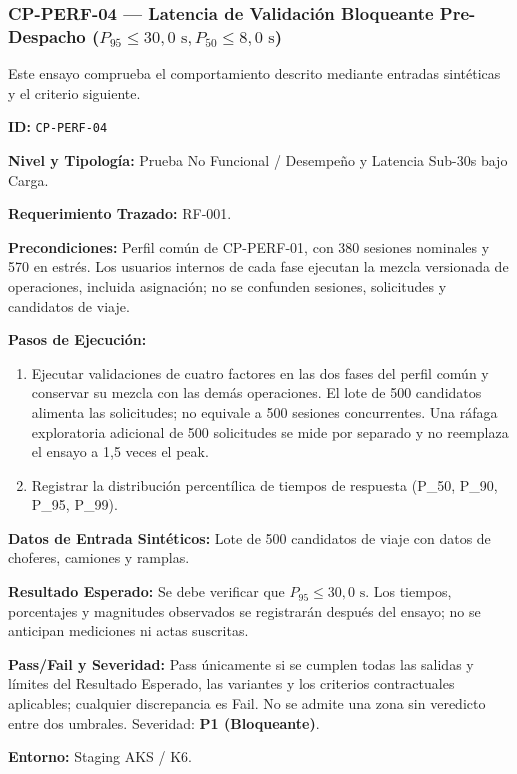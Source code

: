 \subsubsection*{CP-PERF-04 — Latencia de Validación Bloqueante Pre-Despacho ($P_{95} \le 30{,}0\text{ s}, P_{50} \le 8{,}0\text{ s}$)}\label{sec:9-cp-perf-04}
Este ensayo comprueba el comportamiento descrito mediante entradas sintéticas y el criterio siguiente.

\par\noindent \textbf{ID:} \texttt{CP-\allowbreak{}PERF-\allowbreak{}04}\par
\par\noindent \textbf{Nivel y Tipología:} Prueba No Funcional / Desempeño y Latencia Sub-30s bajo Carga.\par
\par\noindent \textbf{Requerimiento Trazado:} RF-001.\par
\par\noindent \textbf{Precondiciones:} Perfil común de CP-PERF-01, con 380 sesiones nominales y 570 en estrés. Los usuarios internos de cada fase ejecutan la mezcla versionada de operaciones, incluida asignación; no se confunden sesiones, solicitudes y candidatos de viaje.\par
\par\noindent \textbf{Pasos de Ejecución:}\par
\begin{enumerate}
\item Ejecutar validaciones de cuatro factores en las dos fases del perfil común y conservar su mezcla con las demás operaciones. El lote de 500 candidatos alimenta las solicitudes; no equivale a 500 sesiones concurrentes. Una ráfaga exploratoria adicional de 500 solicitudes se mide por separado y no reemplaza el ensayo a 1,5 veces el peak.
\item Registrar la distribución percentílica de tiempos de respuesta (P\_{50}, P\_{90}, P\_{95}, P\_{99}).
\end{enumerate}

\par\noindent \textbf{Datos de Entrada Sintéticos:} Lote de 500 candidatos de viaje con datos de choferes, camiones y ramplas.\par
\par\noindent \textbf{Resultado Esperado:} Se debe verificar que $P_{95} \le 30{,}0\text{ s}$. Los tiempos, porcentajes y magnitudes observados se registrarán después del ensayo; no se anticipan mediciones ni actas suscritas.\par
\par\noindent \textbf{Pass/Fail y Severidad:} Pass únicamente si se cumplen todas las salidas y límites del Resultado Esperado, las variantes y los criterios contractuales aplicables; cualquier discrepancia es Fail. No se admite una zona sin veredicto entre dos umbrales. Severidad: \textbf{P1 (Bloqueante)}.\par
\par\noindent \textbf{Entorno:} Staging AKS / K6.\par



